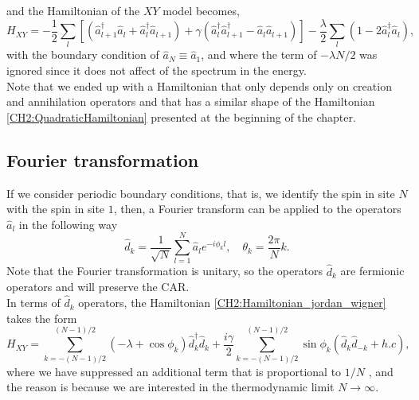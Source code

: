 and the Hamiltonian of the $XY$ model becomes,
\begin{equation}
H_{X Y}=-\frac{1}{2} \sum_{l}\left[\left(\hat{a}_{l+1}^{\dagger} \hat{a}_{l}+\hat{a}_{l}^{\dagger} \hat{a}_{l+1}\right)+\gamma\left(\hat{a}_{l}^{\dagger} \hat{a}_{l+1}^{\dagger}-\hat{a}_{l} \hat{a}_{l+1}\right)\right]-\frac{\lambda}{2} \sum_{l}\left(1-2 \hat{a}_{l}^{\dagger} \hat{a}_{l}\right),
\label{CH2:Hamiltonian_jordan_wigner}
\end{equation}
with the boundary condition of $\hat{a}_{N} \equiv \hat{a}_{1}$, and where the term of $-\lambda N/2$ was ignored since it does not affect of the spectrum in the energy\cite{reyes-lega_aspects_2016}.\\
\indent Note that we ended up with a Hamiltonian that only depends only on creation and annihilation operators and that has a similar shape of the Hamiltonian \eqref{CH2:QuadraticHamiltonian} presented at the beginning of the chapter.
\subsection{Fourier transformation}
If we consider periodic boundary conditions, that is, we identify the spin in site $N$ with the spin in site $1$, then, a Fourier transform can be applied to the operators $\hat{a}_{l}$ in the following way  \cite{reyes-lega_aspects_2016}
\begin{equation}
\hat{d}_{k}=\frac{1}{\sqrt{N}} \sum_{l=1}^{N} \hat{a}_{l} e^{-i \phi_{k} l}, \quad \theta_{k}=\frac{2 \pi}{N} k.
\end{equation}
Note that the Fourier transformation is unitary, so the operators $\hat{d}_k$ are fermionic operators and will preserve the CAR.\\
In terms of $\hat{d}_k$ operators, the Hamiltonian \eqref{CH2:Hamiltonian_jordan_wigner} takes the form
\begin{equation}
H_{X Y}=\sum_{k=-(N-1) / 2}^{(N-1) / 2}\left(-\lambda+\cos \phi_{k}\right) \hat{d}_{k}^{\dagger} \hat{d}_{k}+\frac{i \gamma}{2} \sum_{k=-(N-1) / 2}^{(N-1) / 2} \sin \phi_{k}\left(\hat{d}_{k} \hat{d}_{-k}+h . c\right),
\end{equation}
where we have suppressed an additional term that is proportional to $1/N$ \cite{barouch_statistical_1970, barouch_statistical_1971}, and the reason is because we are interested in the thermodynamic limit $N\to \infty$.
